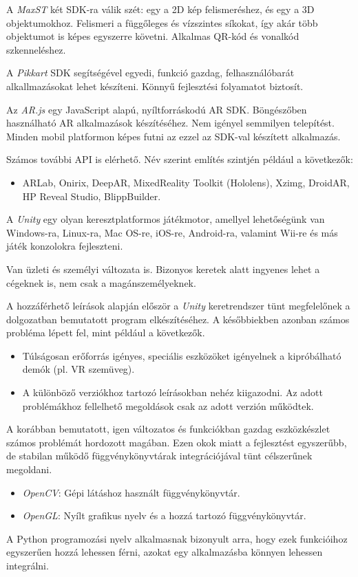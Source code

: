 
A \textit{MaxST} két SDK-ra válik szét: egy a 2D kép felismeréshez, és egy a 3D objektumokhoz.
Felismeri a függőleges és vízszintes síkokat, így akár több objektumot is képes egyszerre követni. Alkalmas QR-kód és vonalkód szkenneléshez.


A \textit{Pikkart} SDK segítségével egyedi, funkció gazdag, felhasználóbarát alkallmazásokat lehet készíteni. Könnyű fejlesztési folyamatot biztosít.


Az \textit{AR.js} egy JavaScript alapú, nyíltforráskodú AR SDK. Böngészőben használható AR alkalmazások készítéséhez. Nem igényel semmilyen telepítést. Minden mobil platformon képes futni az ezzel az SDK-val készített alkalmazás.


Számos további API is elérhető. Név szerint említés szintjén például a következők:
\begin{itemize}
\item ARLab,
Onirix,
DeepAR,
MixedReality Toolkit (Hololens),
Xzimg,
DroidAR,
HP Reveal Studio,
BlippBuilder.
\end{itemize}


A \textit{Unity} egy  olyan keresztplatformos játékmotor, amellyel lehetőségünk van Windows-ra, Linux-ra, Mac OS-re, iOS-re, Android-ra, valamint Wii-re és más játék konzolokra fejleszteni.

Van üzleti és személyi változata is. Bizonyos keretek alatt ingyenes lehet a cégeknek is, nem csak a magánszemélyeknek.

A hozzáférhető leírások alapján először a \textit{Unity} keretrendszer tünt megfelelőnek a dolgozatban bemutatott program elkészítéséhez.
A későbbiekben azonban számos probléma lépett fel, mint például a következők.
\begin{itemize}
	\item Túlságosan erőforrás igényes, speciális eszközöket igényelnek a kipróbálható demók (pl. VR szemüveg).
	\item A különböző verziókhoz tartozó leírásokban nehéz kiigazodni. Az adott problémákhoz fellelhető megoldások csak az adott verzión működtek.
\end{itemize}


A korábban bemutatott, igen változatos és funkciókban gazdag eszközkészlet számos problémát hordozott magában.
Ezen okok miatt a fejlesztést egyszerűbb, de stabilan működő függvénykönyvtárak integrációjával tünt célszerűnek megoldani.
\begin{itemize}
	\item \textit{OpenCV}: Gépi látáshoz használt függvénykönyvtár.
	\item \textit{OpenGL}: Nyílt grafikus nyelv és a hozzá tartozó függvénykönyvtár.
\end{itemize}
A Python programozási nyelv alkalmasnak bizonyult arra, hogy ezek funkcióihoz egyszerűen hozzá lehessen férni, azokat egy alkalmazásba könnyen lehessen integrálni.

